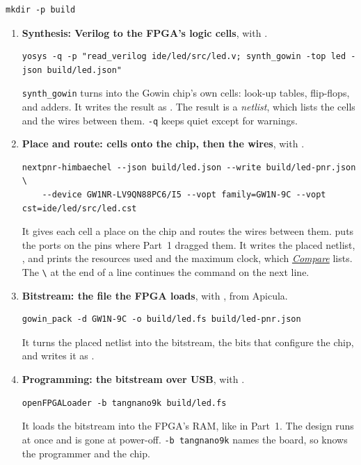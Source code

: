 \documentclass[11pt,a4paper]{article}
\begin{document}
\begin{verbatim}
mkdir -p build
\end{verbatim}

\begin{enumerate}
  \item \textbf{Synthesis: Verilog to the FPGA’s logic cells}, with .
\begin{verbatim}
yosys -q -p "read_verilog ide/led/src/led.v; synth_gowin -top led -json build/led.json"
\end{verbatim}
  \texttt{synth\_gowin} turns  into the Gowin chip’s own cells: look-up tables, flip-flops, and adders. It writes the result as . The result is a \emph{netlist}, which lists the cells and the wires between them. \texttt{-q} keeps  quiet except for warnings.

  \item \textbf{Place and route: cells onto the chip, then the wires}, with .
\begin{verbatim}
nextpnr-himbaechel --json build/led.json --write build/led-pnr.json \
    --device GW1NR-LV9QN88PC6/I5 --vopt family=GW1N-9C --vopt cst=ide/led/src/led.cst
\end{verbatim}
  It gives each cell a place on the chip and routes the wires between them.  puts the ports on the pins where Part~1 dragged them. It writes the placed netlist, , and prints the resources used and the maximum clock, which \hyperref[sec:compare]{\emph{Compare}} lists. The \texttt{\textbackslash} at the end of a line continues the command on the next line.

  \item \textbf{Bitstream: the file the FPGA loads}, with , from Apicula.
\begin{verbatim}
gowin_pack -d GW1N-9C -o build/led.fs build/led-pnr.json
\end{verbatim}
  It turns the placed netlist into the bitstream, the bits that configure the chip, and writes it as .

  \item \textbf{Programming: the bitstream over USB}, with .
\begin{verbatim}
openFPGALoader -b tangnano9k build/led.fs
\end{verbatim}
  It loads the bitstream into the FPGA’s RAM, like  in Part~1. The design runs at once and is gone at power-off. \texttt{-b tangnano9k} names the board, so  knows the programmer and the chip.
\end{enumerate}
\end{document}
